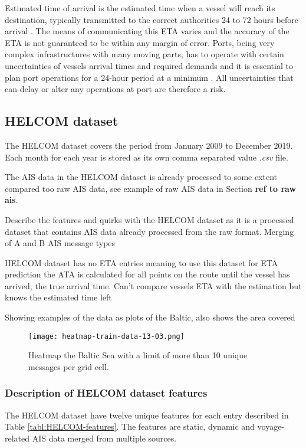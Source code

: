 \documentclass[../main.tex]{subfiles}
\begin{document}
Estimated time of arrival is the estimated time when a vessel will reach its destination, typically transmitted to the correct authorities 24 to 72 hours before arrival \cite{Veenstra_2021, EU_2009}. The means of communicating this ETA varies and the accuracy of the ETA is not guaranteed to be within any margin of error. Ports, being very complex infrastructures with many moving parts, has to operate with certain uncertainties of vessels arrival times and required demands and it is essential to plan port operations for a 24-hour period at a minimum \cite{Fancello_2011}. All uncertainties that can delay or alter any operations at port are therefore a risk.

\subsection{HELCOM dataset}

The HELCOM dataset covers the period from January 2009 to December 2019. Each month for each year is stored as its own comma separated value \textit{.csv} file.

The AIS data in the HELCOM dataset is already processed to some extent compared too raw AIS data, see example of raw AIS data in Section \textbf{ref to raw ais}.

Describe the features and quirks with the HELCOM dataset as it is a processed dataset that contains AIS data already processed from the raw format. Merging of A and B AIS message types

HELCOM dataset has no ETA entries meaning to use this dataset for ETA prediction the ATA is calculated for all points on the route until the vessel has arrived, the true arrival time. Can't compare vessels ETA with the estimation but knows the estimated time left 

Showing examples of the data as plots of the Baltic, also shows the area covered

\begin{figure}[H]
\centering
\texttt{[image: heatmap-train-data-13-03.png]}
\caption{Heatmap the Baltic Sea with a limit of more than 10 unique messages per grid cell.}
\label{fig:heatmap}
\end{figure}


\subsubsection{Description of HELCOM dataset features}

The HELCOM dataset have twelve unique features for each entry described in Table \ref{tabl:HELCOM-features}. The features are static, dynamic and voyage-related AIS data merged from multiple sources.
\end{document}
